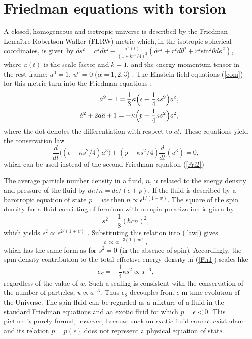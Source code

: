 \documentclass[prd,onecolumn,nofootinbib,showkeys]{revtex4}
\begin{document}
\section{Friedman equations with torsion}
A closed, homogeneous and isotropic universe is described by the Friedman-Lema\^{i}tre-Robertson-Walker (FLRW) metric which, in the isotropic spherical coordinates, is given by $ds^2=c^2 dt^2-\frac{a^2(t)}{(1+kr^2/4)^2}(dr^2+r^2 d\theta^2+r^2\mbox{sin}^2\theta d\phi^2)$, where $a(t)$ is the scale factor and $k=1$, and the energy-momentum tensor in the rest frame: $u^0=1,\,u^\alpha=0$ ($\alpha=1,2,3$) \cite{LL}.
The Einstein field equations (\ref{com}) for this metric turn into the Friedman equations \cite{Kop,Tra,dSS1,dSS2,Gas}:
\begin{eqnarray}
& & {\dot{a}}^2+1=\frac{1}{3}\kappa\Bigl(\epsilon-\frac{1}{4}\kappa s^2\Bigr)a^2, \label{Fri1} \\
& & {\dot{a}}^2+2a\ddot{a}+1=-\kappa\Bigl(p-\frac{1}{4}\kappa s^2\Bigr)a^2,
\label{Fri2}
\end{eqnarray}
where the dot denotes the differentiation with respect to $ct$.
These equations yield the conservation law
\begin{equation}
\frac{d}{dt}\bigl((\epsilon-\kappa s^2/4)a^3\bigr)+(p-\kappa s^2/4)\frac{d}{dt}(a^3)=0,
\label{law}
\end{equation}
which can be used instead of the second Friedman equation (\ref{Fri2}).

The average particle number density in a fluid, $n$, is related to the energy density and pressure of the fluid by $dn/n=d\epsilon/(\epsilon+p)$.
If the fluid is described by a barotropic equation of state $p=w\epsilon$ then $n\propto\epsilon^{1/(1+w)}$.
The square of the spin density for a fluid consisting of fermions with no spin polarization is given by
\begin{equation}
s^2=\frac{1}{8}(\hbar cn)^2,
\label{ome1}
\end{equation}
which yields $s^2\propto\epsilon^{2/(1+w)}$ \cite{NP}.
Substituting this relation into (\ref{law}) gives \cite{Gas}
\begin{equation}
\epsilon\propto a^{-3(1+w)},
\label{scaling}
\end{equation}
which has the same form as for $s^2=0$ (in the absence of spin).
Accordingly, the spin-density contribution to the total effective energy density in (\ref{Fri1}) scales like
\begin{equation}
\epsilon_S=-\frac{1}{4}\kappa s^2\propto a^{-6},
\label{ome2}
\end{equation}
regardless of the value of $w$.
Such a scaling is consistent with the conservation of the number of particles, $n\propto a^{-3}$.
Thus $\epsilon_S$ decouples from $\epsilon$ in time evolution of the Universe.
The spin fluid can be regarded as a mixture of a fluid in the standard Friedman equations and an exotic fluid for which $p=\epsilon<0$.
This picture is purely formal, however, because such an exotic fluid cannot exist alone and its relation $p=p(\epsilon)$ does not represent a physical equation of state.
\end{document}

